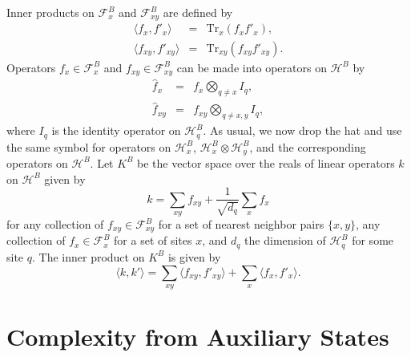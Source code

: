 \documentclass[12pt,amsmath,amssymb,onecolumn]{revtex4-2}
\begin{document}
Inner products on $\mathcal{F}^B_x$ and $\mathcal{F}^B_{xy}$ are defined by
\begin{subequations}
\begin{eqnarray}
  \label{ffprime1x}
   \langle  f_x, f'_x \rangle  &=& \mathrm{Tr}_x( f_x f'_x), \\
  \label{ffprime2x}
   \langle  f_{xy}, f'_{xy} \rangle  &=& \mathrm{Tr}_{xy}( f_{xy} f'_{xy}).
\end{eqnarray}
\end{subequations}
Operators
$f_x \in \mathcal{F}^B_x$ and $f_{xy} \in \mathcal{F}^B_{xy}$ can be made into
operators on $\mathcal{H}^B$ by 
\begin{subequations}
\begin{eqnarray}
\label{defhf1x}
\hat{ f}_x &=&  f_x \bigotimes_{q \ne x} I_q, \\
\label{defhf2x}
\hat{ f}_{xy} &=&  f_{xy} \bigotimes_{q \ne x,y} I_q, 
\end{eqnarray}
\end{subequations}
where $I_q$ is the identity operator on $\mathcal{H}^B_q$.
As usual, we now drop the hat and use the same symbol for operators  
on $\mathcal{H}^B_x$,
$\mathcal{H}^B_x \otimes \mathcal{H}^B_y$,
and the corresponding operators on $\mathcal{H}^B$.
Let $K^B$ be the vector space over the
reals of linear operators $k$ on $\mathcal{H}^B$ given by 
\begin{equation}
\label{defk1x}
k = \sum_{x y} f_{x y} + \frac{1}{\sqrt{d_q}} \sum_x f_x
\end{equation}
for any collection of 
$f_{x y} \in \mathcal{F}^B_{x y}$ for a set of nearest neighbor pairs $\{x, y\}$,
any collection of $f_x \in \mathcal{F}^B_x$ for a set of sites $x$, and $d_q$ the dimension
of $\mathcal{H}^B_q$ for some site $q$.
The inner product on $K^B$ is given by 
\begin{equation}
\label{defkkprime1x}
 \langle  k, k' \rangle   =  \sum_{xy}  \langle  f_{xy}, f'_{xy} \rangle  + \sum_x  \langle  f_x, f'_x \rangle .
\end{equation}

\section{\label{subsec:auxiliarycomplexity} Complexity from Auxiliary States}
\end{document}
